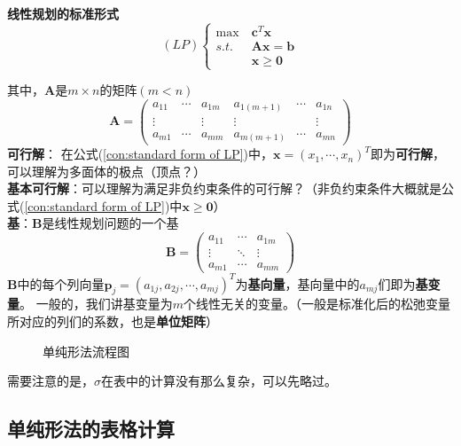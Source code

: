 \documentclass{book}
\begin{document}
\textbf{线性规划的标准形式}
\begin{equation}
    (LP)
    \begin{cases}
        \max\  & \boldsymbol{c}^T\boldsymbol{x}  \\
        s.t.   & \boldsymbol{Ax}=\boldsymbol{b}  \\
               & \boldsymbol{x}\ge\boldsymbol{0}
    \end{cases}
    \label{con:standard form of LP}
\end{equation}

其中，$\boldsymbol{A}$是$m\times n$的矩阵$(m<n)$
$$\boldsymbol{A}=
    \begin{pmatrix}
        a_{11} & \cdots & a_{1m} & a_{1(m+1)} & \cdots & a_{1n} \\
        \vdots &        & \vdots & \vdots     &        & \vdots \\
        a_{m1} & \cdots & a_{mm} & a_{m(m+1)} & \cdots & a_{mn}
    \end{pmatrix}
$$
\textbf{可行解}：
在公式(\ref{con:standard form of LP})中，$\boldsymbol{x}=(x_1, \cdots, x_n)^T$即为\textbf{可行解}，可以理解为多面体的极点（顶点？）\\
\textbf{基本可行解}：可以理解为满足非负约束条件的可行解？（非负约束条件大概就是公式(\ref{con:standard form of LP})中$\boldsymbol{x\ge0}$）\\
\textbf{基}：$\boldsymbol{B}$是线性规划问题的一个基
$$\boldsymbol{B}=
    \begin{pmatrix}
        a_{11} & \cdots & a_{1m} \\
        \vdots & \ddots & \vdots \\
        a_{m1} & \cdots & a_{mm}
    \end{pmatrix}$$
$\boldsymbol{B}$中的每个列向量$\boldsymbol{p}_j=(a_{1j}, a_{2j}, \cdots, a_{mj})^T$为\textbf{基向量}，基向量中的$a_{mj}$们即为\textbf{基变量}。
一般的，我们讲基变量为$m$个线性无关的变量。（一般是标准化后的松弛变量所对应的列们的系数，也是\textbf{单位矩阵}）

\begin{figure}[ht]
    \centering
    
    \caption{单纯形法流程图}
    \label{fig:SimplexMethodFlow}
\end{figure}


需要注意的是，$\sigma$在表中的计算没有那么复杂，可以先略过。

\subsection{单纯形法的表格计算}
\end{document}
